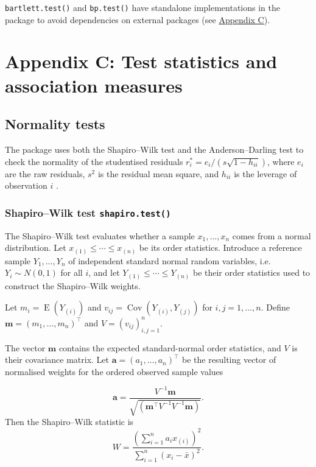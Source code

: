 \texttt{bartlett.test()} and \texttt{bp.test()} have standalone implementations in the package to avoid dependencies on external packages (see \hyperref[variance]{Appendix C}).

\section{Appendix C: Test statistics and association measures}\label{tests}

\subsection{Normality tests}\label{norm}

The package uses both the Shapiro--Wilk test and the Anderson--Darling test to check the normality of the studentised residuals
\(r_i^* = e_i / (s\sqrt{1-h_{ii}})\), where \(e_i\) are the raw residuals,
\(s^2\) is the residual mean square, and \(h_{ii}\) is the leverage of
observation \(i\) \citep{Cook:1982}.

\subsubsection{\texorpdfstring{Shapiro--Wilk test \texttt{shapiro.test()}}{Shapiro--Wilk test shapiro.test()}}\label{shap}

The Shapiro--Wilk test \citep{Shapiro:1965} evaluates whether a sample
\(x_1,\ldots,x_n\) comes from a normal distribution. Let
\(x_{(1)}\le \cdots \le x_{(n)}\) be its order statistics. Introduce a
reference sample \(Y_1,\ldots,Y_n\) of independent standard normal random
variables, i.e.~\(Y_i \sim N(0,1)\) for all \(i\), and let
\(Y_{(1)}\le \cdots \le Y_{(n)}\) be their order statistics used to construct the Shapiro--Wilk weights.

Let \(m_i = \operatorname{E}(Y_{(i)})\) and
\(v_{ij} = \operatorname{Cov}(Y_{(i)}, Y_{(j)})\) for
\(i,j = 1,\ldots,n\). Define
\(\mathbf{m} = (m_1,\ldots,m_n)^\top\) and
\(V = (v_{ij})_{i,j=1}^n\).

The vector \(\mathbf{m}\) contains the expected standard-normal order
statistics, and \(V\) is their covariance matrix.
Let \(\mathbf{a}=(a_1,\ldots,a_n)^\top\) be the resulting vector of
normalised weights for the ordered observed sample values

\[\mathbf{a}
=\frac{V^{-1}\mathbf{m}}
{\sqrt{\left(\mathbf{m}^\top V^{-1}V^{-1}\mathbf{m}\right)}}.\]
Then the Shapiro--Wilk statistic is
\[W=\frac{\left(\sum_{i=1}^{n} a_i x_{(i)}\right)^2}
{\sum_{i=1}^{n} (x_i-\bar{x})^2}.\]

